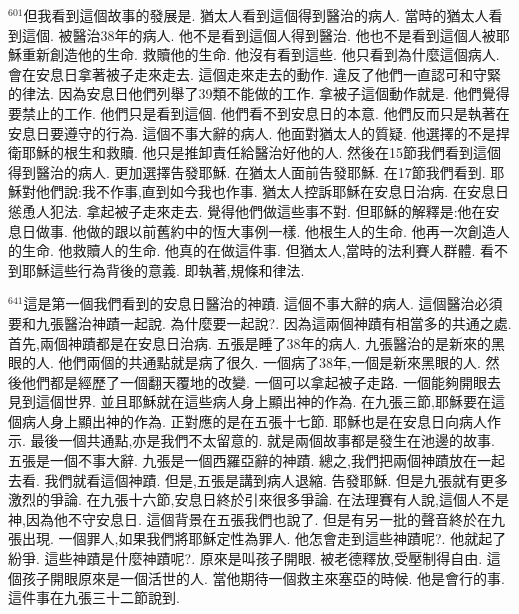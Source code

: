\documentclass{book}
\begin{document}
$^{601}$但我看到這個故事的發展是.
猶太人看到這個得到醫治的病人.
當時的猶太人看到這個.
被醫治38年的病人.
他不是看到這個人得到醫治.
他也不是看到這個人被耶穌重新創造他的生命.
救贖他的生命.
他沒有看到這些.
他只看到為什麼這個病人.
會在安息日拿著被子走來走去.
這個走來走去的動作.
違反了他們一直認可和守緊的律法.
因為安息日他們列舉了39類不能做的工作.
拿被子這個動作就是.
他們覺得要禁止的工作.
他們只是看到這個.
他們看不到安息日的本意.
他們反而只是執著在安息日要遵守的行為.
這個不事大辭的病人.
他面對猶太人的質疑.
他選擇的不是捍衛耶穌的根生和救贖.
他只是推卸責任給醫治好他的人.
然後在15節我們看到這個得到醫治的病人.
更加選擇告發耶穌.
在猶太人面前告發耶穌.
在17節我們看到.
耶穌對他們說:我不作事,直到如今我也作事.
猶太人控訴耶穌在安息日治病.
在安息日慫恿人犯法.
拿起被子走來走去.
覺得他們做這些事不對.
但耶穌的解釋是:他在安息日做事.
他做的跟以前舊約中的恆大事例一樣.
他根生人的生命.
他再一次創造人的生命.
他救贖人的生命.
他真的在做這件事.
但猶太人,當時的法利賽人群體.
看不到耶穌這些行為背後的意義.
即執著,規條和律法.

$^{641}$這是第一個我們看到的安息日醫治的神蹟.
這個不事大辭的病人.
這個醫治必須要和九張醫治神蹟一起說.
為什麼要一起說?.
因為這兩個神蹟有相當多的共通之處.
首先,兩個神蹟都是在安息日治病.
五張是睡了38年的病人.
九張醫治的是新來的黑眼的人.
他們兩個的共通點就是病了很久.
一個病了38年,一個是新來黑眼的人.
然後他們都是經歷了一個翻天覆地的改變.
一個可以拿起被子走路.
一個能夠開眼去見到這個世界.
並且耶穌就在這些病人身上顯出神的作為.
在九張三節,耶穌要在這個病人身上顯出神的作為.
正對應的是在五張十七節.
耶穌也是在安息日向病人作示.
最後一個共通點,亦是我們不太留意的.
就是兩個故事都是發生在池邊的故事.
五張是一個不事大辭.
九張是一個西羅亞辭的神蹟.
總之,我們把兩個神蹟放在一起去看.
我們就看這個神蹟.
但是,五張是講到病人退縮.
告發耶穌.
但是九張就有更多激烈的爭論.
在九張十六節,安息日終於引來很多爭論.
在法理賽有人說,這個人不是神,因為他不守安息日.
這個背景在五張我們也說了.
但是有另一批的聲音終於在九張出現.
一個罪人,如果我們將耶穌定性為罪人.
他怎會走到這些神蹟呢?.
他就起了紛爭.
這些神蹟是什麼神蹟呢?.
原來是叫孩子開眼.
被老德釋放,受壓制得自由.
這個孩子開眼原來是一個活世的人.
當他期待一個救主來塞亞的時候.
他是會行的事.
這件事在九張三十二節說到.
\end{document}
